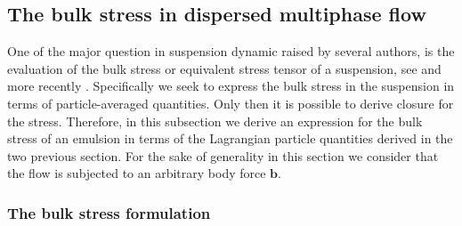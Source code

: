 

\subsection{The bulk stress in dispersed multiphase flow}



One of the major question in suspension dynamic raised by several authors, is the evaluation of the bulk stress or equivalent stress tensor of a suspension, see \citep{batchelor1970stress, prosperetti2006stress,zhang1997momentum,nadim1996concise} and more recently \citet{dolata2020heterogeneous}. 
Specifically we seek to express the bulk stress in the suspension in terms of particle-averaged quantities. 
Only then it is possible to derive closure for the stress. 
Therefore, in this subsection we derive an expression for the bulk stress of an emulsion in terms of the Lagrangian particle quantities derived in the two previous section. 
For the sake of generality in this section we consider that the flow is subjected to an arbitrary body force $\textbf{b}$. 

\subsubsection{The bulk stress formulation}

